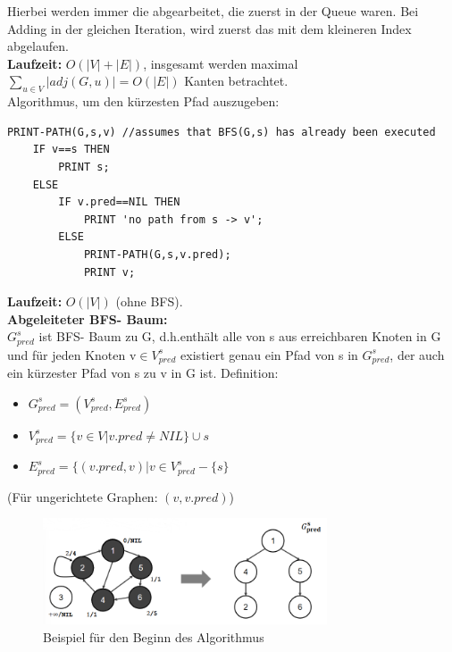 \documentclass{article}
\begin{document}
            Hierbei werden immer die abgearbeitet, die zuerst in der Queue waren. Bei Adding in der gleichen Iteration, wird zuerst das mit dem kleineren Index abgelaufen.\\
            \textbf{Laufzeit:} $O(|V|+|E|)$, insgesamt werden maximal $\sum_{u\in V}|adj(G,u)| = O(|E|)$ Kanten betrachtet.\\
            Algorithmus, um den kürzesten Pfad auszugeben:\\
            \begin{lstlisting}[style=pseudocode]
PRINT-PATH(G,s,v) //assumes that BFS(G,s) has already been executed
    IF v==s THEN
        PRINT s;
    ELSE
        IF v.pred==NIL THEN
            PRINT 'no path from s -> v';
        ELSE
            PRINT-PATH(G,s,v.pred);
            PRINT v;
            \end{lstlisting}
            \textbf{Laufzeit:} $O(|V|)$ (ohne BFS).\\
            \textbf{Abgeleiteter BFS- Baum:}\\
            $G^s_{pred}$ ist BFS- Baum zu G, d.h.enthält alle von s aus erreichbaren Knoten in G und für jeden Knoten v$\in V^s_{pred}$ existiert genau ein Pfad von s in $G^s_{pred}$, der auch ein kürzester Pfad von s zu v in G ist.
            Definition: 
            \begin{itemize}
                \item $G^s_{pred} = (V^s_{pred}, E^s_{pred})$
                \item $V^s_{pred} = \{v\in V|v.pred\neq NIL\} \cup {s}$
                \item $E^s_{pred} = \{ (v.pred,v) | v \in V^s_{pred} -\{s\}$
            \end{itemize}
            (Für ungerichtete Graphen: $(v,v.pred)$)
            \begin{figure}[ht]
                \centering
                \includegraphics[width=0.75\textwidth]{Bilder/BFSAbg.png}
                \caption{Beispiel für den Beginn des Algorithmus}
                \label{fig:BFSAbg}
            \end{figure}
\end{document}
